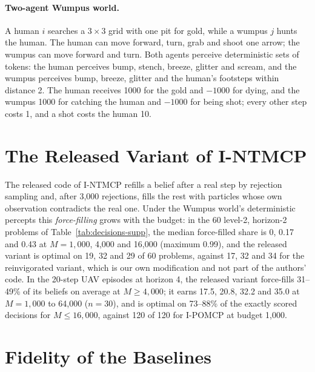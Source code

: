 \documentclass{article}
\begin{document}
\paragraph{Two-agent Wumpus world.} A human $i$ searches a $3 \times 3$ grid with one pit for gold, while a wumpus $j$ hunts the human. The human can move forward, turn, grab and shoot one arrow; the wumpus can move forward and turn. Both agents perceive deterministic sets of tokens: the human perceives bump, stench, breeze, glitter and scream, and the wumpus perceives bump, breeze, glitter and the human's footsteps within distance 2. The human receives 1000 for the gold and $-1000$ for dying, and the wumpus 1000 for catching the human and $-1000$ for being shot; every other step costs 1, and a shot costs the human 10.

\section{The Released Variant of I-NTMCP}

The released code of I-NTMCP refills a belief after a real step by rejection sampling and, after 3{,}000 rejections, fills the rest with particles whose own observation contradicts the real one. Under the Wumpus world's deterministic percepts this \emph{force-filling} grows with the budget: in the 60 level-2, horizon-2 problems of Table~\ref{tab:decisions-supp}, the median force-filled share is 0, 0.17 and 0.43 at $M = 1{,}000$, 4{,}000 and 16{,}000 (maximum 0.99), and the released variant is optimal on 19, 32 and 29 of 60 problems, against 17, 32 and 34 for the reinvigorated variant, which is our own modification and not part of the authors' code. In the 20-step UAV episodes at horizon 4, the released variant force-fills 31--49\% of its beliefs on average at $M \geq 4{,}000$; it earns 17.5, 20.8, 32.2 and 35.0 at $M = 1{,}000$ to 64{,}000 ($n = 30$), and is optimal on 73--88\% of the exactly scored decisions for $M \leq 16{,}000$, against 120 of 120 for I-POMCP at budget 1{,}000.

\section{Fidelity of the Baselines}
\end{document}
